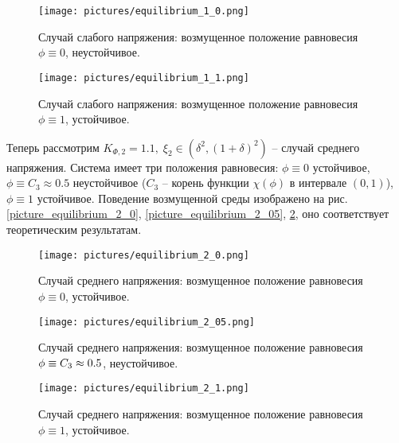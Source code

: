 \documentclass[a4paper,12pt]{article}
\newcommand*{\hm}[1]{#1\nobreak\discretionary{}
{\hbox{$\mathsurround=0pt #1$}}{}}
\theoremstyle{plain}
\theoremstyle{definition}
\begin{document}
\begin{figure}[!t]
    \centering
    \texttt{[image: pictures/equilibrium\_1\_0.png]}
    \vspace{-0.8cm}
    \caption{Случай слабого напряжения: возмущенное положение равновесия $\phi \equiv 0$, \linebreak неустойчивое.}
    \label{picture_equilibrium_1_0}
    \vspace{0.5cm}
    
    \texttt{[image: pictures/equilibrium\_1\_1.png]}
    \vspace{-0.8cm}
    \caption{Случай слабого напряжения: возмущенное положение равновесия $\phi \equiv 1$, \linebreak устойчивое.}
    \label{picture_equilibrium_1_1}
\end{figure}

Теперь рассмотрим $K_{\Phi, 2} = 1.1, \; \xi_2 \in (\delta^2, (1 + \delta)^2)$ -- случай среднего напряжения. Система имеет три положения равновесия: $\phi \equiv 0$ устойчивое, $\phi \equiv C_3 \approx 0.5$ неустойчивое ($C_3$ -- корень функции $\chi(\phi)$ в интервале $(0, 1)$), $\phi \equiv 1$ устойчивое. Поведение возмущенной среды изображено на рис. \ref{picture_equilibrium_2_0}, \ref{picture_equilibrium_2_05}, \ref{picture_equilibrium_2_1}, оно соответствует теоретическим результатам.

\begin{figure}[!tp]
    \centering
    \texttt{[image: pictures/equilibrium\_2\_0.png]}
    \vspace{-0.8cm}
    \caption{Случай среднего напряжения: возмущенное положение равновесия $\phi \equiv 0$, \linebreak устойчивое.}
    \label{picture_equilibrium_2_0}
    \vspace{0.5cm}

    \texttt{[image: pictures/equilibrium\_2\_05.png]}
    \vspace{-0.8cm}
    \caption{Случай среднего напряжения: возмущенное положение равновесия $\phi \equiv C_3 \hm \approx 0.5$, неустойчивое.}
    \label{picture_equilibrium_2_05}
    \vspace{0.5cm}
    
    \texttt{[image: pictures/equilibrium\_2\_1.png]}
    \vspace{-0.8cm}
    \caption{Случай среднего напряжения: возмущенное положение равновесия $\phi \equiv 1$, \linebreak устойчивое.}
    \label{picture_equilibrium_2_1}
\end{figure}
\end{document}
